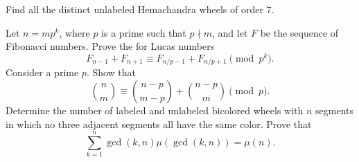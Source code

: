 \begin{starter}
  \exercise Find all the distinct unlabeled Hemachandra wheels of order $7$.
\end{starter}

\begin{routine}
  \exercise Let $n=mp^k$, where $p$ is a prime such that $p\nmid m$, and let $F$ be the sequence of Fibonacci numbers. Prove the  for Lucas numbers
  \begin{equation*}
    F_{n-1}+F_{n+1}\equiv F_{n/p-1}+F_{n/p+1}\pmod{p^k}.
  \end{equation*}
  \exercise Consider a prime $p$. Show that
  \begin{equation*}
    \binom{n}{m} \equiv \binom{n-p}{m-p}+\binom{n-p}{m}\pmod{p}.
  \end{equation*}
  \exercise Determine the number of labeled and unlabeled bicolored wheels with $n$ segments in which no three adjacent segments all have the same color.
  \exercise Prove that
  \begin{equation*}
    \sum_{k=1}^n\gcd(k,n)\mu(\gcd(k,n))=\mu(n).
  \end{equation*}
\end{routine}

